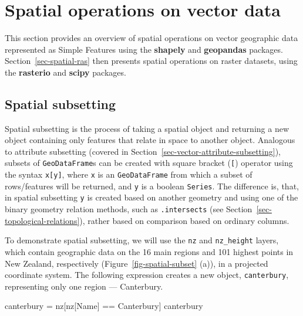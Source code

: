 \documentclass[
  letterpaper,
]{krantz}
\newenvironment{Shaded}{\begin{snugshade}}{\end{snugshade}}
\newcommand{\NormalTok}[1]{\textcolor[rgb]{0.00,0.23,0.31}{#1}}
\newcommand{\OperatorTok}[1]{\textcolor[rgb]{0.37,0.37,0.37}{#1}}
\newcommand{\StringTok}[1]{\textcolor[rgb]{0.13,0.47,0.30}{#1}}
\begin{document}
\section{Spatial operations on vector data}\label{sec-spatial-vec}

This section provides an overview of spatial operations on vector
geographic data represented as Simple Features using the
\textbf{shapely} and \textbf{geopandas} packages.
Section~\ref{sec-spatial-ras} then presents spatial operations on raster
datasets, using the \textbf{rasterio} and \textbf{scipy} packages.

\subsection{Spatial subsetting}\label{sec-spatial-subsetting-vector}

Spatial subsetting is the process of taking a spatial object and
returning a new object containing only features that relate in space to
another object. Analogous to attribute subsetting (covered in
Section~\ref{sec-vector-attribute-subsetting}), subsets of
\texttt{GeoDataFrame}s can be created with square bracket (\texttt{{[}})
operator using the syntax \texttt{x{[}y{]}}, where \texttt{x} is an
\texttt{GeoDataFrame} from which a subset of rows/features will be
returned, and \texttt{y} is a boolean \texttt{Series}. The difference
is, that, in spatial subsetting \texttt{y} is created based on another
geometry and using one of the binary geometry relation methods, such as
\texttt{.intersects} (see Section~\ref{sec-topological-relations}),
rather based on comparison based on ordinary columns.

To demonstrate spatial subsetting, we will use the \texttt{nz} and
\texttt{nz\_height} layers, which contain geographic data on the 16 main
regions and 101 highest points in New Zealand, respectively
(Figure~\ref{fig-spatial-subset} (a)), in a projected coordinate system.
The following expression creates a new object, \texttt{canterbury},
representing only one region --- Canterbury.

\begin{Shaded}
\begin{Highlighting}[]
\NormalTok{canterbury }\OperatorTok{=}\NormalTok{ nz[nz[}\StringTok{\textquotesingle{}Name\textquotesingle{}}\NormalTok{] }\OperatorTok{==} \StringTok{\textquotesingle{}Canterbury\textquotesingle{}}\NormalTok{]}
\NormalTok{canterbury}
\end{Highlighting}
\end{Shaded}
\end{document}

